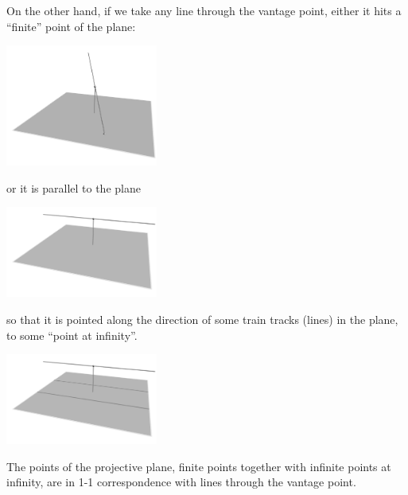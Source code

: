 On the other hand, if we take any line through the vantage point, either it hits a ``finite'' point of the plane:
\begin{center}
\includegraphics[width=5cm]{above-the-plane-connect}
\end{center}
or it is parallel to the plane
\begin{center}
\includegraphics[width=5cm]{above-the-plane-off-to-infinity}
\end{center}
so that it is pointed along the direction of some train tracks (lines) in the plane, to some ``point at infinity''.
\begin{center}
\includegraphics[width=5cm]{above-the-plane-3}
\end{center}
The points of the projective plane, finite points together with infinite points at infinity, are in 1-1 correspondence with lines through the vantage point.

